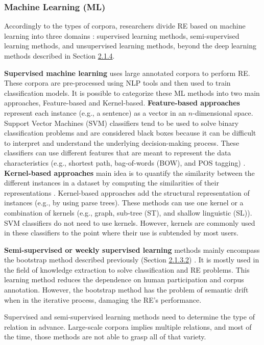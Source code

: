 \subsubsection{Machine Learning (ML)}

Accordingly to the types of corpora, researchers divide RE based on machine learning into three domains \citep{zhang2017review}: supervised learning methods, semi-supervised learning methods, and unsupervised learning methods, beyond the deep learning methods described in Section \hyperlink{2.1.4}{2.1.4}. 

\textbf{Supervised machine learning} uses large annotated corpora to perform RE. These corpora are pre-processed using NLP tools and then used to train classification models. It is possible to categorize these ML methods into two main approaches, Feature-based and Kernel-based. \textbf{Feature-based approaches} represent each instance (e.g., a sentence) as a vector in an $n$-dimensional space. Support Vector Machines (SVM) classifiers tend to be used to solve binary classification problems and are considered black boxes because it can be difficult to interpret and understand the underlying decision-making process. These classifiers can use different features that are meant to represent the data characteristics (e.g., shortest path, bag-of-words (BOW), and POS tagging) \citep{kim2008detection}. \textbf{Kernel-based approaches} main idea is to quantify the similarity between the different instances in a dataset by computing the similarities of their representations \citep{giuliano2006exploiting}. Kernel-based approaches add the structural representation of instances (e.g., by using parse trees). These methods can use one kernel or a combination of kernels (e.g., graph, sub-tree (ST), and shallow linguistic (SL)). SVM classifiers do not need to use kernels. However, kernels are commonly used in these classifiers to the point where their use is subtended by most users. 

\textbf{Semi-supervised or weekly supervised learning} methods mainly encompass the bootstrap method described previously (Section \hyperlink{2.1.3.2}{2.1.3.2}) \citep{hoffmann2011knowledge,augenstein2015extracting}. It is mostly used in the field of knowledge extraction to solve classification and RE problems. 
This learning method reduces the dependence on human participation and corpus annotation. However, the bootstrap method has the problem of semantic drift when in the iterative process, damaging the RE's performance.

Supervised and semi-supervised learning methods need to determine the type of relation in advance. Large-scale corpora implies multiple relations, and most of the time, those methods are not able to grasp all of that variety. 

